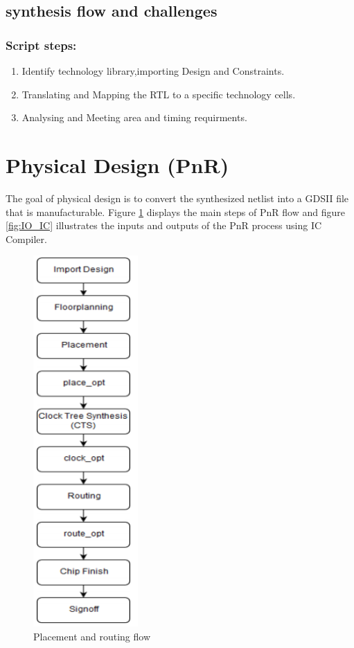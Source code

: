 \documentclass[../main.tex]{subfiles}
\begin{document}
\subsection{synthesis flow and challenges}
\subsubsection{Script steps:}
\begin{enumerate}
\item  Identify technology library,importing Design and Constraints.
\item  Translating and Mapping the RTL to a specific technology cells.
\item  Analysing and Meeting area and timing requirments.
\end{enumerate}

\section{Physical Design (PnR)}
The goal of physical design is to convert the synthesized netlist into a GDSII file that is 
manufacturable. Figure \ref{fig:PnR_flow} displays the main steps of PnR flow and figure \ref{fig:IO_IC} illustrates the inputs and outputs of the PnR process using IC Compiler.

\begin{figure}[h]
\centering
\includegraphics[width=4cm]{diagrams/PnR_flow.PNG}
\caption{Placement and routing flow}
\label{fig:PnR_flow}
\end{figure}
\end{document}
